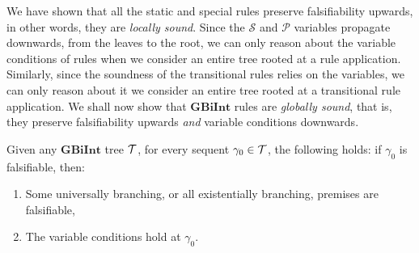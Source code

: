\documentclass{llncs}
\numberwithin{equation}{section}
\newcommand{\Pred}{{\mathcal{P}}}
\newcommand{\Succ}{{\mathcal{S}}}
\newcommand{\mycal}[1]{
        {\cal{#1}}
}
\newcommand{\GBiInt}{\mathbf{GBiInt}}
\newcommand{\tree}[1]{
        {\mycal{#1}}
}
\begin{document}
We have shown that all the static and special rules preserve falsifiability upwards, in other words, they are \textit{locally sound}. Since the $\Succ$ and $\Pred$ variables propagate downwards, from the leaves to the root, we can only reason about the variable conditions of rules when we consider an entire tree rooted at a rule application. Similarly, since the soundness of the transitional rules relies on the variables, we can only reason about it we consider an entire tree rooted at a transitional rule application. We shall now show that $\GBiInt$ rules are \textit{globally sound}, that is, they preserve falsifiability upwards \textit{and} variable conditions downwards.

\begin{lemma}\label{globalSoundness}
Given any $\GBiInt$ tree $\tree{T}$, for every sequent $\gamma_0 \in \tree{T}$, the following holds: if $\gamma_0$ is falsifiable, then:
\begin{enumerate}
	\item Some universally branching, or all existentially branching, premises are falsifiable,
	\item The variable conditions hold at $\gamma_0$.
\end{enumerate}
\end{lemma}
\end{document}
